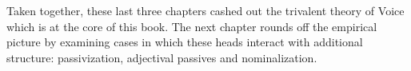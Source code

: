 Taken together, these last three chapters cashed out the trivalent theory of Voice which is at the core of this book. The next chapter rounds off the empirical picture by examining cases in which these heads interact with additional structure: passivization, adjectival passives and nominalization.

